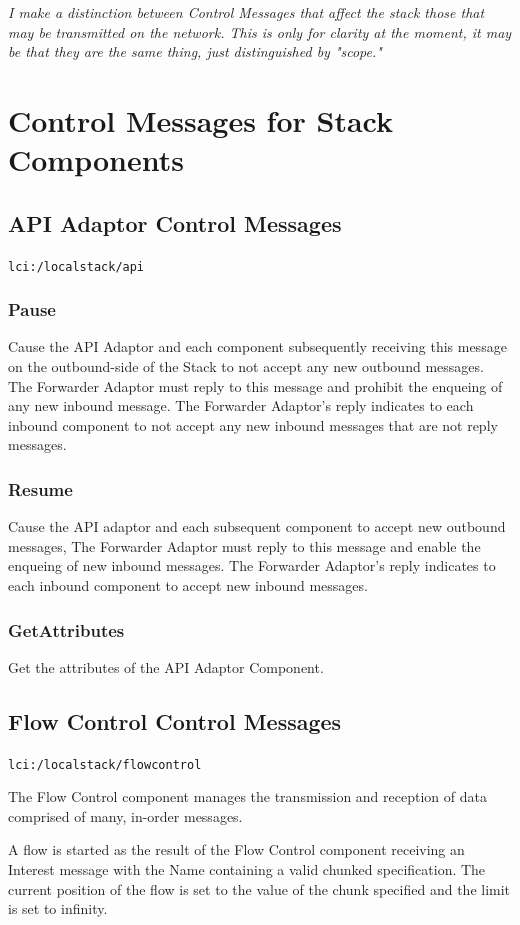 {\it I make a distinction between Control Messages that affect the stack those that may be transmitted on the network.  This is only for clarity at the moment, it may be that they are the same thing, just distinguished by "scope."}

\section{Control Messages for Stack Components}
\subsection{API Adaptor Control Messages}
{\tt lci:/localstack/api}

\subsubsection{Pause}
Cause the API Adaptor and each component subsequently receiving this message
on the outbound-side of the Stack to not accept any new outbound messages.
The Forwarder Adaptor must reply to this message and prohibit the enqueing
of any new inbound message.
The Forwarder Adaptor's reply indicates to each inbound component
to not accept any new inbound messages that are not reply messages.

\subsubsection{Resume}
Cause the API adaptor and each subsequent component to accept new outbound messages,
The Forwarder Adaptor must reply to this message and enable the enqueing of new inbound messages.
The Forwarder Adaptor's reply indicates to each inbound component to accept new inbound messages.

\subsubsection{GetAttributes}
Get the attributes of the API Adaptor Component.

\subsection{Flow Control Control Messages}
{\tt lci:/localstack/flowcontrol}

The Flow Control component manages the transmission and reception of data comprised of many,
in-order messages.

A flow is started as the result of the Flow Control component
receiving an Interest message with the Name containing a valid chunked specification.
The current position of the flow is set to the value of the chunk
specified and the limit is set to infinity.


